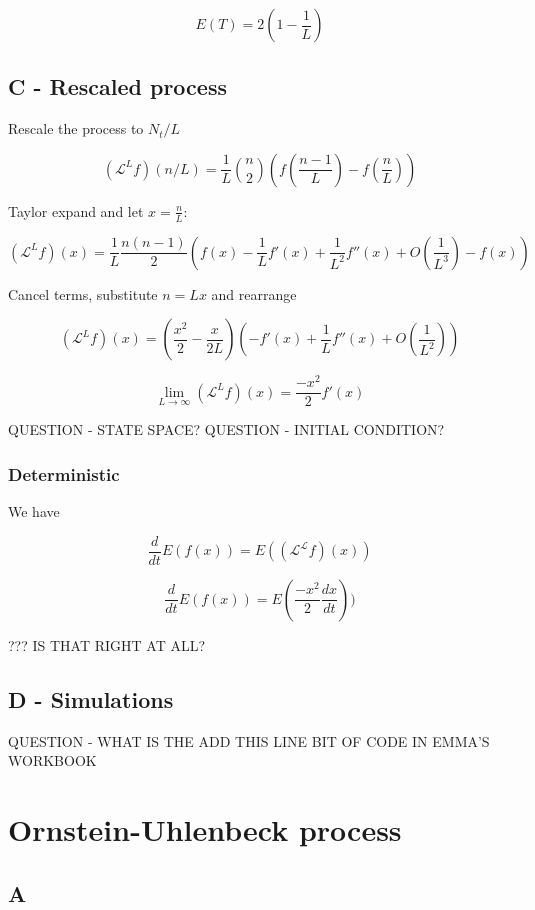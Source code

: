 \documentclass{article}
\begin{document}
$$E(T) = 2(1 - \frac{1}{L})$$


\subsection{C - Rescaled process}

Rescale the process to $N_t/L$

$$(\mathcal{L}^Lf)(n/L) = \frac{1}{L} {n\choose2} (f(\frac{n-1}{L}) - f(\frac{n}{L}))$$

Taylor expand and let $x=\frac{n}{L}$:

$$(\mathcal{L}^Lf)(x) = \frac{1}{L}\frac{n(n-1)}{2} (f(x) - \frac{1}{L}f'(x) + \frac{1}{L^2}f''(x) + O(\frac{1}{L^3}) - f(x))$$

Cancel terms, substitute $n=Lx$ and rearrange

$$(\mathcal{L}^Lf)(x) = (\frac{x^2}{2} - \frac{x}{2L})(- f'(x) + \frac{1}{L}f''(x) + O(\frac{1}{L^2}))$$

$$\lim_{L \to \infty} (\mathcal{L}^Lf)(x) = \frac{-x^2}{2}f'(x)$$



QUESTION - STATE SPACE?
QUESTION - INITIAL CONDITION?


\subsubsection{Deterministic}

We have

$$\frac{d}{dt}E(f(x)) = E((\mathcal{L^L}f)(x))$$

$$\frac{d}{dt}E(f(x)) = E(\frac{-x^2}{2}\frac{dx}{dt}))$$

??? IS THAT RIGHT AT ALL?




\subsection{D - Simulations}

QUESTION - WHAT IS THE ADD THIS LINE BIT OF CODE IN EMMA'S WORKBOOK

\section{Ornstein-Uhlenbeck process}

\subsection{A}
\end{document}
